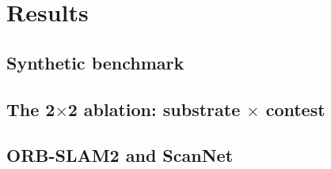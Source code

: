 \section{Results}
\label{sec:geo_results}

\subsection{Synthetic benchmark}
\label{sec:geo_results_synth}

\subsection{The 2$\times$2 ablation: substrate $\times$ contest}
\label{sec:geo_ablation}

\subsection{ORB-SLAM2 and ScanNet}
\label{sec:geo_results_real}
